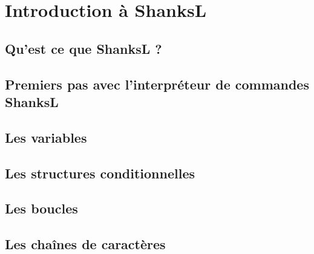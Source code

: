 \chapter{Introduction à ShanksL}



\section{Qu'est ce que ShanksL ?}



\section{Premiers pas avec l'interpréteur de commandes ShanksL}


\section{Les variables}
\section{Les structures conditionnelles}
\section{Les boucles}
\section{Les chaînes de caractères}